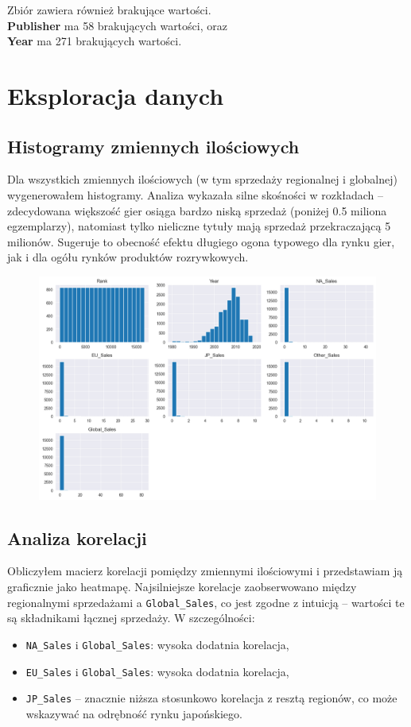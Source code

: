 \documentclass[11pt]{article}
\begin{document}
Zbiór zawiera również brakujące wartości. \\
\textbf{Publisher} ma 58 brakujących wartości, oraz \\
\textbf{Year} ma 271 brakujących wartości.

\section{Eksploracja danych}\label{sec:eksploracja-danych}

\subsection{Histogramy zmiennych ilościowych}\label{subsec:histogramy-zmiennych-ilosciowych}

Dla wszystkich zmiennych ilościowych (w tym sprzedaży regionalnej i globalnej) wygenerowałem histogramy.
Analiza wykazała silne skośności w rozkładach -- zdecydowana większość gier osiąga bardzo niską sprzedaż (poniżej 0.5 miliona egzemplarzy),
natomiast tylko nieliczne tytuły mają sprzedaż przekraczającą 5 milionów.
Sugeruje to obecność efektu długiego ogona typowego dla rynku gier, jak i dla ogółu rynków produktów rozrywkowych.

\begin{figure}[H]
    \centering
    \includegraphics[width=0.5\linewidth]{figures/histogramy}
    \caption{}
    \label{fig:histogramy}
\end{figure}

\subsection{Analiza korelacji}\label{subsec:analiza-korelacji}

Obliczyłem macierz korelacji pomiędzy zmiennymi ilościowymi i przedstawiam ją graficznie jako heatmapę.
Najsilniejsze korelacje zaobserwowano między regionalnymi sprzedażami a \texttt{Global\_Sales},
co jest zgodne z intuicją – wartości te są składnikami łącznej sprzedaży.
W szczególności:
\begin{itemize}
  \item \texttt{NA\_Sales} i \texttt{Global\_Sales}: wysoka dodatnia korelacja,
  \item \texttt{EU\_Sales} i \texttt{Global\_Sales}: wysoka dodatnia korelacja,
  \item \texttt{JP\_Sales} – znacznie niższa stosunkowo korelacja z resztą regionów, co może wskazywać na odrębność rynku japońskiego.
\end{itemize}
\end{document}
